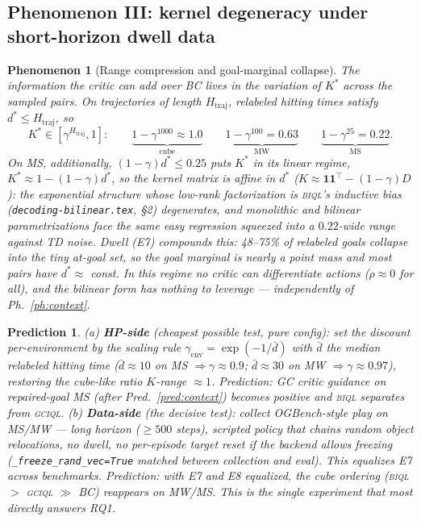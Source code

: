 \documentclass[10pt]{article}
\newtheorem{phenomenon}{Phenomenon}
\newtheorem{prediction}{Prediction}
\begin{document}
\subsection{Phenomenon III: kernel degeneracy under short-horizon dwell data}

\begin{phenomenon}[Range compression and goal-marginal collapse]\label{ph:kernel}
The information the critic can add over BC lives in the \emph{variation} of $K^*$ across
the sampled pairs. On trajectories of length $H_{\mathrm{traj}}$, relabeled hitting times
satisfy $d^*\le H_{\mathrm{traj}}$, so
\begin{equation}
K^*\in[\gamma^{H_{\mathrm{traj}}},1]:\qquad
\underbrace{1-\gamma^{1000}\approx 1.0}_{\text{cube}}\qquad
\underbrace{1-\gamma^{100}=0.63}_{\text{MW}}\qquad
\underbrace{1-\gamma^{25}=0.22}_{\text{MS}} .
\end{equation}
On MS, additionally, $(1-\gamma)d^*\le0.25$ puts $K^*$ in its linear regime,
$K^*\approx 1-(1-\gamma)d^*$, so the kernel matrix is affine in $d^*$
($K\approx \mathbf{1}\mathbf{1}^\top-(1-\gamma)D$): the exponential structure whose
low-rank factorization is \textsc{biql}'s inductive bias (\texttt{decoding-bilinear.tex},
\S2) degenerates, and monolithic and bilinear parametrizations face the same easy
regression squeezed into a $0.22$-wide range against TD noise. Dwell (E7) compounds this:
48--75\% of relabeled goals collapse into the tiny at-goal set, so the goal marginal is
nearly a point mass and most pairs have $d^*\approx$ const. In this regime no critic can
differentiate actions ($\rho\approx0$ for all), and the bilinear form has nothing to
leverage --- \emph{independently} of Ph.~\ref{ph:context}.
\end{phenomenon}

\begin{prediction}\label{pred:kernel}
(a) \textbf{HP-side} (cheapest possible test, pure config): set the discount per-environment
by the scaling rule $\gamma_{\mathrm{env}}=\exp(-1/\bar d)$ with $\bar d$ the median
relabeled hitting time ($\bar d\!\approx\!10$ on MS $\Rightarrow\gamma\approx0.9$;
$\bar d\!\approx\!30$ on MW $\Rightarrow\gamma\approx0.97$), restoring the cube-like ratio
$K$-range $\approx1$. Prediction: GC critic guidance on repaired-goal MS (after
Pred.~\ref{pred:context}) becomes positive and \textsc{biql} separates from \textsc{gciql}.
(b) \textbf{Data-side} (the decisive test): collect OGBench-style \emph{play} on MS/MW ---
long horizon ($\ge500$ steps), scripted policy that chains random object relocations,
no dwell, no per-episode target reset if the backend allows freezing
(\texttt{\_freeze\_rand\_vec=True} matched between collection and eval). This equalizes E7
across benchmarks. Prediction: with E7 and E8 equalized, the cube ordering
(\textsc{biql} $>$ \textsc{gciql} $\gg$ BC) reappears on MW/MS. This is the single
experiment that most directly answers RQ1.
\end{prediction}
\end{document}
